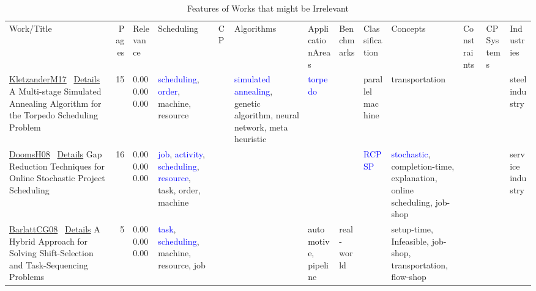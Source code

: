 {\scriptsize
\begin{longtable}{>{\raggedright\arraybackslash}p{3cm}r>{\raggedright\arraybackslash}p{1.0cm}>{\raggedright\arraybackslash}p{ 1.50cm}>{\raggedright\arraybackslash}p{ 1.50cm}>{\raggedright\arraybackslash}p{ 1.50cm}>{\raggedright\arraybackslash}p{ 1.50cm}>{\raggedright\arraybackslash}p{ 1.50cm}>{\raggedright\arraybackslash}p{ 1.50cm}>{\raggedright\arraybackslash}p{ 1.50cm}>{\raggedright\arraybackslash}p{ 1.50cm}>{\raggedright\arraybackslash}p{ 1.50cm}>{\raggedright\arraybackslash}p{ 1.50cm}}
\rowcolor{white}\caption{Features of Works that might be Irrelevant}\\ \toprule
\rowcolor{white}Work/Title & Pages & Relevance & Scheduling& CP& Algorithms& ApplicationAreas& Benchmarks& Classification& Concepts& Constraints& CPSystems& Industries\\ \midrule\endhead
\bottomrule
\endfoot
\href{../scheduling/works/KletzanderM17.pdf}{KletzanderM17}~\cite{KletzanderM17} \hyperref[detail:KletzanderM17]{Details} A Multi-stage Simulated Annealing Algorithm for the Torpedo Scheduling Problem & 15 & \noindent{}\textcolor{black!50}{0.00} \textcolor{black!50}{0.00} \textcolor{black!50}{0.00} & \textcolor{blue}{scheduling}, \textcolor{blue}{order}, \textcolor{black!40}{machine}, \textcolor{black!40}{resource} &  & \textcolor{blue}{simulated annealing}, \textcolor{black!40}{genetic algorithm}, \textcolor{black!40}{neural network}, \textcolor{black!40}{meta heuristic} & \textcolor{blue}{torpedo} &  & \textcolor{black!40}{parallel machine} & \textcolor{black!40}{transportation} &  &  & \textcolor{black!40}{steel industry}\\
\href{../scheduling/works/DoomsH08.pdf}{DoomsH08}~\cite{DoomsH08} \hyperref[detail:DoomsH08]{Details} Gap Reduction Techniques for Online Stochastic Project Scheduling & 16 & \noindent{}\textcolor{black!50}{0.00} \textcolor{black!50}{0.00} \textcolor{black!50}{0.00} & \textcolor{blue}{job}, \textcolor{blue}{activity}, \textcolor{blue}{scheduling}, \textcolor{blue}{resource}, \textcolor{black!40}{task}, \textcolor{black!40}{order}, \textcolor{black!40}{machine} &  &  &  &  & \textcolor{blue}{RCPSP} & \textcolor{blue}{stochastic}, \textcolor{black!40}{completion-time}, \textcolor{black!40}{explanation}, \textcolor{black!40}{online scheduling}, \textcolor{black!40}{job-shop} &  &  & \textcolor{black!40}{service industry}\\
\href{../scheduling/works/BarlattCG08.pdf}{BarlattCG08}~\cite{BarlattCG08} \hyperref[detail:BarlattCG08]{Details} A Hybrid Approach for Solving Shift-Selection and Task-Sequencing Problems & 5 & \noindent{}\textcolor{black!50}{0.00} \textcolor{black!50}{0.00} \textcolor{black!50}{0.00} & \textcolor{blue}{task}, \textcolor{blue}{scheduling}, \textcolor{black!40}{machine}, \textcolor{black!40}{resource}, \textcolor{black!40}{job} &  &  & \textcolor{black}{automotive}, \textcolor{black!40}{pipeline} & \textcolor{black!40}{real-world} &  & \textcolor{black!40}{setup-time}, \textcolor{black!40}{Infeasible}, \textcolor{black!40}{job-shop}, \textcolor{black!40}{transportation}, \textcolor{black!40}{flow-shop} &  &  & \\

\end{longtable}}
